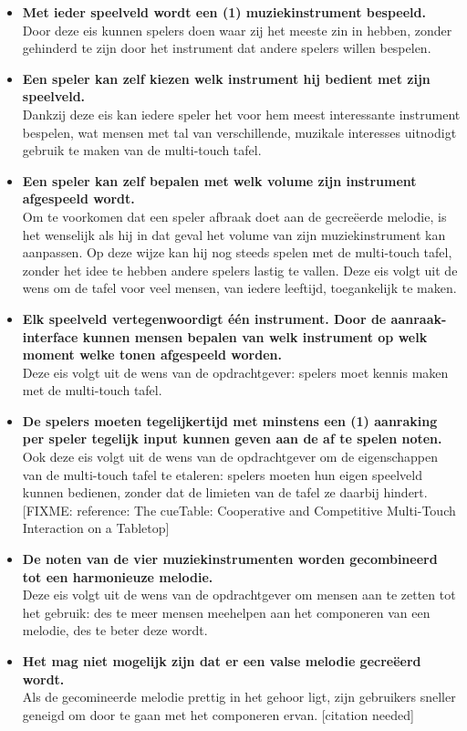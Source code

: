 \documentclass{acm}
\begin{document}
\begin{itemize}
	\item \textbf{Met ieder speelveld wordt een (1) muziekinstrument bespeeld.} \\ Door deze eis kunnen spelers doen waar zij het meeste zin in hebben, zonder gehinderd te zijn door het instrument dat andere spelers willen bespelen.
	\item \textbf{Een speler kan zelf kiezen welk instrument hij bedient met zijn speelveld.} \\ Dankzij deze eis kan iedere speler het voor hem meest interessante instrument bespelen, wat mensen met tal van verschillende, muzikale interesses uitnodigt gebruik te maken van de multi-touch tafel.
	\item \textbf{Een speler kan zelf bepalen met welk volume zijn instrument afgespeeld wordt.} \\ Om te voorkomen dat een speler afbraak doet aan de gecreëerde melodie, is het wenselijk als hij in dat geval het volume van zijn muziekinstrument kan aanpassen. Op deze wijze kan hij nog steeds spelen met de multi-touch tafel, zonder het idee te hebben andere spelers lastig te vallen. Deze eis volgt uit de wens om de tafel voor veel mensen, van iedere leeftijd, toegankelijk te maken.
	\item \textbf{Elk speelveld vertegenwoordigt één instrument. Door de aanraak-interface kunnen mensen bepalen van welk instrument op welk moment welke tonen afgespeeld worden.} \\ Deze eis volgt uit de wens van de opdrachtgever: spelers moet kennis maken met de multi-touch tafel.
	\item \textbf{De spelers moeten tegelijkertijd met minstens een (1) aanraking per speler tegelijk input kunnen geven aan de af te spelen noten.} \\ Ook deze eis volgt uit de wens van de opdrachtgever om de eigenschappen van de multi-touch tafel te etaleren: spelers moeten hun eigen speelveld kunnen bedienen, zonder dat de limieten van de tafel ze daarbij hindert. [FIXME: reference: The cueTable: Cooperative and Competitive Multi-Touch Interaction on a Tabletop]
	\item \textbf{De noten van de vier muziekinstrumenten worden gecombineerd tot een harmonieuze melodie.} \\ Deze eis volgt uit de wens van de opdrachtgever om mensen aan te zetten tot het gebruik: des te meer mensen meehelpen aan het componeren van een melodie, des te beter deze wordt.
	\item \textbf{Het mag niet mogelijk zijn dat er een valse melodie gecreëerd wordt.} \\ Als de gecomineerde melodie prettig in het gehoor ligt, zijn gebruikers sneller geneigd om door te gaan met het componeren ervan. [citation needed]

\end{itemize}
\end{document}
